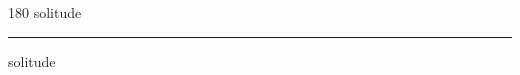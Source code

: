 
\begin{frame}
\begin{center}
\begin{turn}{180}
{\fontsize{2.5cm}{1em}\selectfont solitude}
\end{turn}
\vspace{1em}\par  
\hrule
\vspace{1em}\par  
{\fontsize{2.5cm}{1em}\selectfont solitude}
\end{center}
\end{frame}
